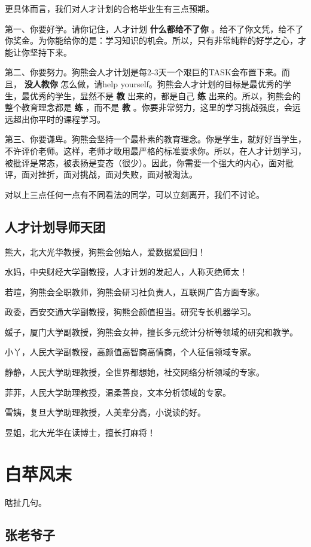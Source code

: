 \documentclass[]{ctexbook}
\begin{document}
更具体而言，我们对人才计划的合格毕业生有三点预期。

第一、你要好学。请你记住，人才计划 \textbf{什么都给不了你}
。给不了你文凭，给不了你奖金。为你能给你的是：学习知识的机会。所以，只有非常纯粹的好学之心，才能让你坚持下来。

第二、你要努力。狗熊会人才计划是每2-3天一个艰巨的TASK会布置下来。而且，
\textbf{没人教你} 怎么做，请help
yourself。狗熊会人才计划的目标是最优秀的学生，最优秀的学生，显然不是
\textbf{教} 出来的，都是自己 \textbf{练}
出来的。所以，狗熊会的整个教育理念都是 \textbf{练} ，而不是 \textbf{教}
。你要非常努力，这里的学习挑战强度，会远远超出你平时的课程学习。

第三、你要谦卑。狗熊会坚持一个最朴素的教育理念。你是学生，就好好当学生，不许评价老师。这样，老师才敢用最严格的标准要求你。所以，在人才计划学习，被批评是常态，被表扬是变态（很少）。因此，你需要一个强大的内心，面对批评，面对挫折，面对挑战，面对失败，面对被淘汰。

对以上三点任何一点有不同看法的同学，可以立刻离开，我们不讨论。

\section{人才计划导师天团}

熊大，北大光华教授，狗熊会创始人，爱数据爱回归！

水妈，中央财经大学副教授，人才计划的发起人，人称灭绝师太！

若暄，狗熊会全职教师，狗熊会研习社负责人，互联网广告方面专家。

政委，西安交通大学副教授，狗熊会颜值担当。研究专长机器学习。

媛子，厦门大学副教授，狗熊会女神，擅长多元统计分析等领域的研究和教学。

小丫，人民大学副教授，高颜值高智商高情商，个人征信领域专家。

静静，人民大学助理教授，全世界都想她，社交网络分析领域的专家。

菲菲，人民大学助理教授，温柔善良，文本分析领域的专家。

雪姨，复旦大学助理教授，人美辈分高，小说读的好。

昱姐，北大光华在读博士，擅长打麻将！

\chapter{白苹风末}\label{wind}

瞎扯几句。

\section{张老爷子}
\end{document}
